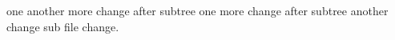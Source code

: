 one another more change after subtree
one more change after subtree
another change
sub file change.
